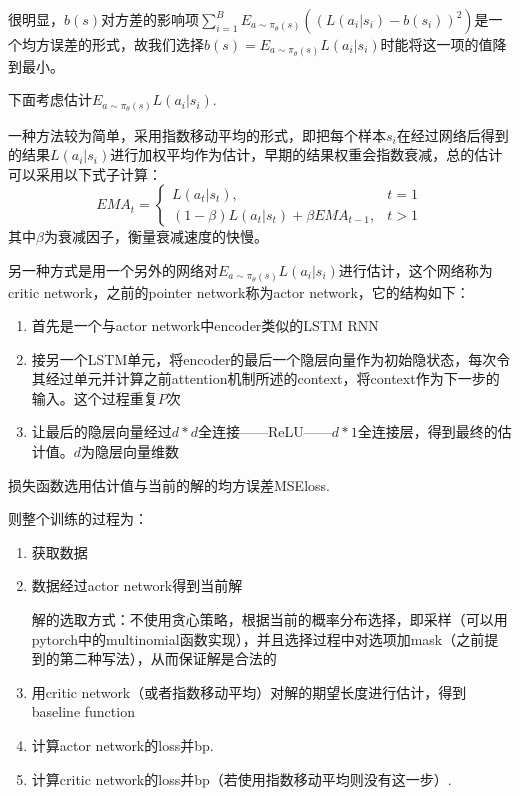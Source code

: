 \documentclass[10pt]{article}
\begin{document}
很明显，$b\left(s\right)$对方差的影响项$\sum_{i=1}^BE_{a\sim \pi_\theta\left(s\right)}\left(\left(L\left(a_i|s_i\right)-b\left(s_i\right)\right)^2\right)$是一个均方误差的形式，故我们选择$b\left(s\right)=E_{a\sim \pi_\theta\left(s\right)}L\left(a_i|s_i\right)$时能将这一项的值降到最小。

下面考虑估计$ E_{a\sim \pi_\theta\left(s\right)}L\left(a_i|s_i\right)$.

一种方法较为简单，采用指数移动平均的形式，即把每个样本$s_i$在经过网络后得到的结果$L\left(a_i|s_i\right)$进行加权平均作为估计，早期的结果权重会指数衰减，总的估计可以采用以下式子计算：
$$EMA_t=
\begin{cases}
  L\left(a_t|s_t\right), & t=1 \\
  \left(1-\beta\right)L\left(a_t|s_t\right)+\beta EMA_{t-1}, & t>1
\end{cases}$$
其中$\beta$为衰减因子，衡量衰减速度的快慢。

另一种方式是用一个另外的网络对$ E_{a\sim \pi_\theta\left(s\right)}L\left(a_i|s_i\right)$进行估计，这个网络称为critic network，之前的pointer network称为actor network，它的结构如下：
\begin{enumerate}
\item 首先是一个与actor network中encoder类似的LSTM RNN
\item 接另一个LSTM单元，将encoder的最后一个隐层向量作为初始隐状态，每次令其经过单元并计算之前attention机制所述的context，将context作为下一步的输入。这个过程重复$P$次
\item 让最后的隐层向量经过$d*d$全连接——ReLU——$d*1$全连接层，得到最终的估计值。$d$为隐层向量维数
\end{enumerate}
损失函数选用估计值与当前的解的均方误差MSEloss.

则整个训练的过程为：
\begin{enumerate}
\item 获取数据
\item 数据经过actor network得到当前解

  解的选取方式：不使用贪心策略，根据当前的概率分布选择，即采样（可以用pytorch中的multinomial函数实现），并且选择过程中对选项加mask（之前提到的第二种写法），从而保证解是合法的

\item 用critic network（或者指数移动平均）对解的期望长度进行估计，得到baseline function

\item 计算actor network的loss并bp.

\item 计算critic network的loss并bp（若使用指数移动平均则没有这一步）.
\end{enumerate}
\end{document}
